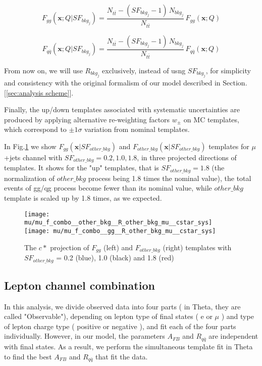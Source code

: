 \documentclass{cmspaperpdf}
\begin{document}
\begin{equation}
F_{gg}(\bm{x};Q|SF_{bkg_j}) = \frac{N_{t\bar{t}}-(SF_{bkg_j}-1)\,N_{bkg_j}}{N_{t\bar{t}}}\,F_{gg}(\bm{x};Q)
\end{equation}

\begin{equation}
F_{q\bar{q}}(\bm{x};Q|SF_{bkg_j}) = \frac{N_{t\bar{t}}-(SF_{bkg_j}-1)\,N_{bkg_j}}{N_{t\bar{t}}}\,F_{q\bar{q}}(\bm{x};Q)
\end{equation}

From now on, we will use $R_{bkg_j}$ exclusively, instead of usng $SF_{bkg_j}$, for simplicity and consistency with the original formalism of our model described in Section.[\ref{sec:analysis scheme}].

Finally, the up/down templates associated with systematic uncertainties are produced by applying alternative re-weighting factors $w_{\pm}$ on MC templates, which correspond to $\pm 1 \sigma$ variation from nominal templates. 

In Fig.\ref{fig:gg_SF_bkg_templates} we show $F_{gg}(\bm{x}|SF_{other\_bkg})$ and $F_{other\_bkg}(\bm{x}|SF_{other\_bkg})$ templates for $\mu$+jets channel with $SF_{other\_bkg}= 0.2,1.0,1.8$, in three projected directions of templates. It shows for the "up" templates, that is $SF_{other\_bkg}=1.8$ (the normalization of $other\_bkg$ process being 1.8 times the nominal value), the total events of gg/qg process become fewer than its nominal value, while $other\_bkg$ template is scaled up by 1.8 times, as we expected.

\begin{figure}[hbt]
  \begin{center}
    \texttt{[image: mu/mu\_f\_combo\_\_other\_bkg\_\_R\_other\_bkg\_mu\_\_cstar\_sys]}
    \texttt{[image: mu/mu\_f\_combo\_\_gg\_\_R\_other\_bkg\_mu\_\_cstar\_sys]}

  \caption{\small The $c*$ projection of $F_{gg}$ (left) and $F_{other\_bkg}$ (right) templates with $SF_{other\_bkg}$ = 0.2 (blue), 1.0 (black) and 1.8 (red)}
    \label{fig:gg_SF_bkg_templates}
  \end{center}
\end{figure}


\subsection{Lepton channel combination} %
\label{sec:lepton combination}

In this analysis, we divide observed data into four parts ( in Theta, they are called "Observable"), depending on lepton type of final states ( e or $\mu$ ) and type of lepton charge type ( positive or negative ), and fit each of the four parts individually. However, in our model, the parameters $A_{FB}$ and $R_{q\bar{q}}$ are independent with final states. As a result, we perform the simultaneous template fit in Theta to find the best $A_{FB}$ and $R_{q\bar{q}}$ that fit the data. 
\end{document}
